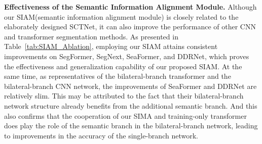 \documentclass[letterpaper]{article} %
\begin{document}
\noindent
{\bf Effectiveness of the Semantic Information Alignment Module.}
Although our SIAM(semantic information alignment module) is closely related to the elaborately designed SCTNet, it can also improve the performance of other CNN and transformer segmentation methods. As presented in Table~\ref{tab:SIAM_Ablation}, employing our SIAM attains consistent improvements on SegFormer, SegNext, SeaFormer, and DDRNet, which proves the effectiveness and generalization capability of our proposed SIAM. At the same time, as representatives of the bilateral-branch transformer and the bilateral-branch CNN network, the improvements of SeaFormer and DDRNet are relatively slim. This may be attributed to the fact that their bilateral-branch network structure already benefits from the additional semantic branch. And this also confirms that the cooperation of our SIMA and training-only transformer does play the role of the semantic branch in the bilateral-branch network, leading to improvements in the accuracy of the single-branch network.
\begin{table}
\begin{center}
    \centering
\end{center}
    \caption{\textbf{Comparison of the effect of the SIAM.}
    }
\label{tab:SIAM_Ablation}
\end{table}
\end{document}
